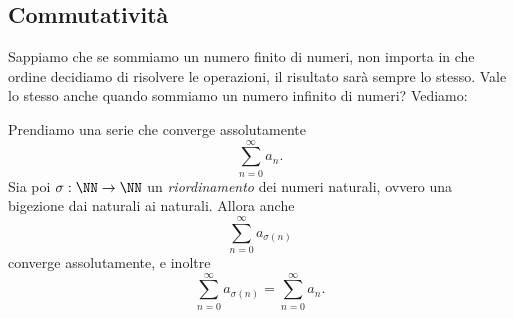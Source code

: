 \documentclass[11pt]{scrartcl}
\begin{document}
	\subsection{Commutatività}
	Sappiamo che se sommiamo un numero finito di numeri, non importa in che ordine decidiamo di risolvere le operazioni, il risultato sarà sempre lo stesso. Vale lo stesso anche quando sommiamo un numero infinito di numeri? Vediamo:
	\begin{theorem}
		Prendiamo una serie che converge assolutamente
		$$\sum_{n=0}^{\infty}a_n.$$
		Sia poi $\sigma:\NN\to\NN$ un \textit{riordinamento} dei numeri naturali, ovvero una bigezione dai naturali ai naturali. Allora anche
		$$\sum_{n=0}^\infty a_{\sigma(n)}$$
		converge assolutamente, e inoltre
		$$\sum_{n=0}^\infty a_{\sigma(n)}=\sum_{n=0}^{\infty}a_n.$$
	\end{theorem}
\end{document}
